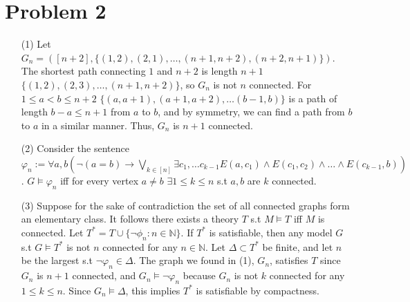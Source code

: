 \documentclass[10pt]{article}
\begin{document}
\section*{Problem 2}
\begin{itemize}
      \item [(1)] Let $G_n=([n+2],\{(1,2),(2,1),\ldots, (n+1,n+2),(n+2,n+1)\})$.
      The shortest path connecting $1$ and $n+2$ is length $n+1$ $\{(1,2),(2,3),\ldots,(n+1,n+2)\}$, so $G_n$ is not $n$ connected.
      For $1\le a<b\le n+2$ $\{(a,a+1),(a+1,a+2),\ldots(b-1,b)\}$ is a path of length $b-a\le n+1$ from $a$ to $b$, and by symmetry, we can find a path from $b$ to $a$ in a similar manner. 
      Thus, $G_n$ is $n+1$ connected. 
      \item [(2)] Consider the sentence $\varphi_n:=\forall a,b(\lnot(a=b)\rightarrow \underset{k\in[n]}{\bigvee}\exists c_1,\ldots c_{k-1} E(a,c_1)\land E(c_1,c_2)\land\ldots\land E(c_{k-1},b))$.
      $G\models \varphi_n$ iff for every vertex $a\neq b$ $\exists 1\le k\le n$ s.t $a,b$ are $k$ connected.
      \item [(3)] Suppose for the sake of contradiction the set of all connected graphs form an elementary class. 
      It follows there exists a theory $T$ s.t $M\models T$ iff $M$ is connected.
      Let $T^*=T\cup\{\lnot\phi_n:n\in\mathbb{N}\}$. 
      If $T^*$ is satisfiable, then any model $G$ s.t $G\models T^*$ is not $n$ connected for any $n\in\mathbb{N}$.
      Let $\Delta\subset T^*$ be finite, and let $n$ be the largest s.t $\lnot\varphi_n\in\Delta$.
      The graph we found in (1), $G_n$, satisfies $T$ since $G_n$ is $n+1$ connected, and $G_n\models \lnot\varphi_n$ because $G_n$ is not $k$ connected for any $1\le k\le n$.
      Since $G_n\models \Delta$, this implies $T^*$ is satisfiable by compactness.
\end{itemize}
\end{document}
